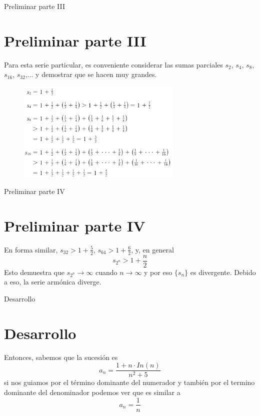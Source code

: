 \documentclass{beamer}
\begin{document}
\begin{frame}{Preliminar parte III}
    \section{Preliminar parte III}
    Para esta serie particular, es conveniente considerar las sumas parciales $s_2$, $s_4$, $s_8$, $s_16$, $s_{32}$,... y demostrar que se hacen muy grandes.
    \begin{figure}[htb]
    \centering
    \includegraphics[width=0.7\textwidth]{suma.png}
\end{figure}
\end{frame}

\begin{frame}{Preliminar parte IV}
    \section{Preliminar parte IV}
    En forma similar, $s_{32}>1+\frac{5}{2}$, $s_{64}>1+\frac{6}{2}$, y, en general
    \begin{equation*}
        s_{2^n}>1+\frac{n}{2}
    \end{equation*}
    Esto demuestra que $s_{2^n}\longrightarrow\infty$ cuando $n\longrightarrow \infty$ y por eso $\{s_n\}$ es divergente. Debido a eso, la serie armónica diverge.
\end{frame}

\begin{frame}{Desarrollo}
    \section{Desarrollo}
    Entonces, sabemos que la sucesión es
    \begin{equation*}
        a_n = \frac{1+n\cdot In(n)}{n^2 +5}
    \end{equation*}
    si nos guiamos por el término dominante del numerador y también por el termino dominante del denominador podemos ver que es similar a 
    \begin{equation*}
        a_n = \frac{1}{n}
    \end{equation*}
\end{frame}
\end{document}
